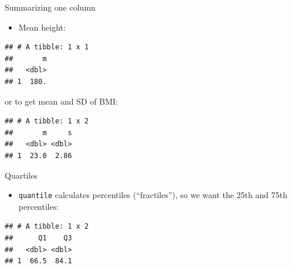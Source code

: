 \documentclass[ignorenonframetext,]{beamer}
\newenvironment{Shaded}{\begin{snugshade}}{\end{snugshade}}
\newcommand{\DataTypeTok}[1]{\textcolor[rgb]{0.13,0.29,0.53}{#1}}
\newcommand{\FloatTok}[1]{\textcolor[rgb]{0.00,0.00,0.81}{#1}}
\newcommand{\KeywordTok}[1]{\textcolor[rgb]{0.13,0.29,0.53}{\textbf{#1}}}
\newcommand{\NormalTok}[1]{#1}
\newcommand{\OperatorTok}[1]{\textcolor[rgb]{0.81,0.36,0.00}{\textbf{#1}}}
\newcommand{\StringTok}[1]{\textcolor[rgb]{0.31,0.60,0.02}{#1}}
\providecommand{\tightlist}{%
  \setlength{\itemsep}{0pt}\setlength{\parskip}{0pt}}
\begin{document}
\begin{frame}[fragile]{Summarizing one column}
\protect\hypertarget{summarizing-one-column}{}

\begin{itemize}
\tightlist
\item
  Mean height:
\end{itemize}

\begin{Shaded}
\end{Shaded}

\begin{verbatim}
## # A tibble: 1 x 1
##       m
##   <dbl>
## 1  180.
\end{verbatim}

or to get mean and SD of BMI:

\begin{Shaded}
\end{Shaded}

\begin{verbatim}
## # A tibble: 1 x 2
##       m     s
##   <dbl> <dbl>
## 1  23.0  2.86
\end{verbatim}

\end{frame}

\begin{frame}[fragile]{Quartiles}
\protect\hypertarget{quartiles}{}

\begin{itemize}
\tightlist
\item
  \texttt{quantile} calculates percentiles (``fractiles''), so we want
  the 25th and 75th percentiles:
\end{itemize}

\begin{Shaded}
\end{Shaded}

\begin{verbatim}
## # A tibble: 1 x 2
##      Q1    Q3
##   <dbl> <dbl>
## 1  66.5  84.1
\end{verbatim}

\end{frame}
\end{document}
